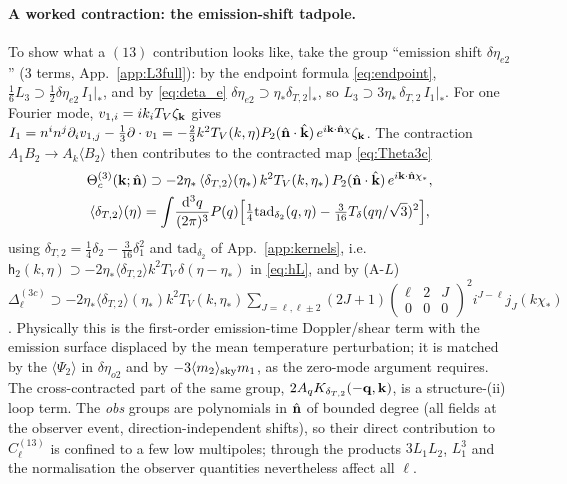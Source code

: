\paragraph{A worked contraction: the emission-shift tadpole.}  To show what a $(13)$ contribution looks like, take the group
``emission shift $\delta\eta_{e2}$'' (3 terms, App.~\ref{app:L3full}): by the endpoint formula \eqref{eq:endpoint}, $\tfrac16L_3\supset\tfrac12\delta\eta_{e2}\,I_1|_*$,
and by \eqref{eq:deta_e} $\delta\eta_{e2}\supset\eta_*\delta_{T,2}|_*$, so $L_3\supset3\eta_*\,\delta_{T,2}\,I_1|_*$.  For one Fourier mode,
$v_{1,i}=ik_iT_V\zeta_{\mathbf k}$ gives $I_1=n^in^j\partial_iv_{1,j}-\tfrac13\partial\cdot v_1=-\tfrac23k^2T_V(k,\eta)P_2(\hat{\mathbf n}\cdot\hat{\mathbf k})\,e^{i\mathbf k\cdot\hat{\mathbf n}\chi}\zeta_{\mathbf k}$.  The
contraction $A_1B_2\to A_k\langle B_2\rangle$ then contributes to the contracted map \eqref{eq:Theta3c}
\begin{gather}
\Theta^{(3)}_c(\mathbf k;\hat{\mathbf n})\supset-2\eta_*\,\langle\delta_{T,2}\rangle(\eta_*)\,k^2T_V(k,\eta_*)\,P_2(\hat{\mathbf n}\cdot\hat{\mathbf k})\,e^{i\mathbf k\cdot\hat{\mathbf n}\chi_*},\nonumber\\
\langle\delta_{T,2}\rangle(\eta)=\int\!\frac{\mathrm d^3q}{(2\pi)^3}P(q)\Big[\tfrac14\mathrm{tad}_{\delta_2}(q,\eta)-\tfrac3{16}T_\delta(q\eta/\sqrt3)^2\Big],
\end{gather}
using $\delta_{T,2}=\tfrac14\delta_2-\tfrac3{16}\delta_1^2$ and $\mathrm{tad}_{\delta_2}$ of App.~\ref{app:kernels},
i.e.\ $\mathsf h_2(k,\eta)\supset-2\eta_*\langle\delta_{T,2}\rangle k^2T_V\,\delta(\eta-\eta_*)$ in \eqref{eq:hL}, and by (A-$L$)
$\Delta^{(3c)}_\ell\supset-2\eta_*\langle\delta_{T,2}\rangle(\eta_*)k^2T_V(k,\eta_*)\sum_{J=\ell,\ell\pm2}(2J+1)(\begin{smallmatrix}\ell&2&J\\0&0&0\end{smallmatrix})^2i^{J-\ell}j_J(k\chi_*)$.
Physically this is the first-order emission-time Doppler/shear term with the emission surface displaced by the mean temperature
perturbation; it is matched by the $\langle\Psi_2\rangle$ in $\delta\eta_{o2}$ and by $-3\langle m_2\rangle_{\rm sky}m_1$, as the zero-mode argument requires.
The cross-contracted part of the same group, $2A_qK_{\delta_{T,2}}(-\mathbf q,\mathbf k)$, is a structure-(ii) loop term.  The
\emph{obs} groups are polynomials in $\hat{\mathbf n}$ of bounded degree (all fields at the observer event, direction-independent shifts), so their
direct contribution to $C^{(13)}_\ell$ is confined to a few low multipoles; through the products $3L_1L_2$, $L_1^3$ and the normalisation the
observer quantities nevertheless affect all $\ell$.
